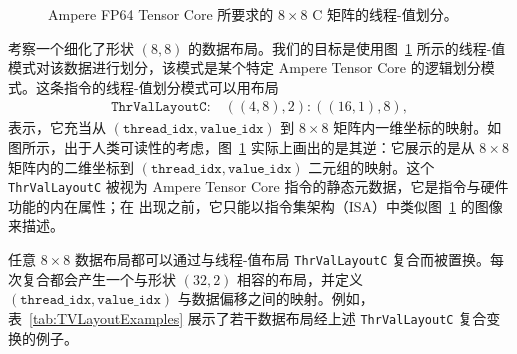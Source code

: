 \begin{figure}[ht]
{
}
\caption{Ampere FP64 Tensor Core 所要求的 $8 {\times} 8$ C 矩阵的线程-值划分。}
\label{fig:TVLayout}
\end{figure}

考察一个细化了形状 $(8,8)$ 的数据布局。我们的目标是使用图~\ref{fig:TVLayout} 所示的线程-值模式对该数据进行划分，该模式是某个特定 Ampere Tensor Core 的逻辑划分模式。这条指令的线程-值划分模式可以用布局
\begin{align*}
\texttt{ThrValLayoutC:} \quad ((4,8),2):((16,1),8),
\end{align*}
表示，它充当从 $(\texttt{thread\_idx}, \texttt{value\_idx})$ 到 $8 {\times} 8$ 矩阵内一维坐标的映射。如图所示，出于人类可读性的考虑，图~\ref{fig:TVLayout} 实际上画出的是其逆：它展示的是从 $8 {\times} 8$ 矩阵内的二维坐标到 $(\texttt{thread\_idx}, \texttt{value\_idx})$ 二元组的映射。这个 {\tt ThrValLayoutC} 被视为 Ampere Tensor Core 指令的静态元数据，它是指令与硬件功能的内在属性；在 \CuTe 出现之前，它只能以指令集架构（ISA）中类似图~\ref{fig:TVLayout} 的图像来描述。

任意 $8 {\times} 8$ 数据布局都可以通过与线程-值布局 {\tt ThrValLayoutC} 复合而被置换。每次复合都会产生一个与形状 $(32,2)$ 相容的布局，并定义 $(\texttt{thread\_idx}, \texttt{value\_idx})$ 与数据偏移之间的映射。例如，表~\ref{tab:TVLayoutExamples} 展示了若干数据布局经上述 {\tt ThrValLayoutC} 复合变换的例子。

